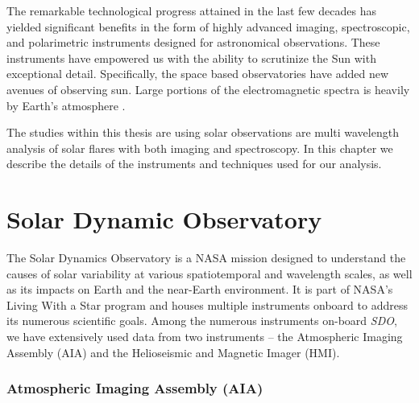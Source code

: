 


The remarkable technological progress attained in the last few decades has yielded significant benefits in the form of highly advanced imaging, spectroscopic, and polarimetric instruments designed for astronomical observations. These instruments have empowered us with the ability to scrutinize the Sun with exceptional detail. Specifically, the space based observatories have added new avenues of observing sun. Large portions of the electromagnetic spectra is heavily by Earth's atmosphere .  

The studies within this thesis are using solar observations are multi wavelength analysis of solar flares with both imaging and spectroscopy. In this chapter we describe the details of the instruments and techniques used for our analysis.

\section{Solar Dynamic Observatory}

The Solar Dynamics Observatory \citep[SDO;][]{sdo} is a NASA mission designed to understand the causes of solar variability at various spatiotemporal and wavelength scales, as well as its impacts on Earth and the near-Earth environment. It is part of NASA’s Living With a Star program and houses multiple instruments onboard to address its numerous scientific goals. Among the numerous instruments on-board {\it SDO}, we have extensively used data from two instruments – the Atmospheric Imaging Assembly (AIA) and the Helioseismic and Magnetic Imager (HMI).

\subsubsection{Atmospheric Imaging Assembly (AIA)}

